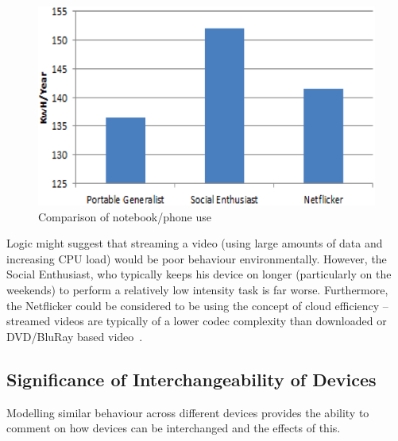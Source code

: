 \documentclass[conference]{IEEEtran}
\begin{document}
\begin{figure}[!ht]
\centering
\includegraphics[width=0.9\columnwidth]{images/comparison_users_devices.png}
\caption{Comparison of notebook/phone use}
\label{fig:comparison_users_devices.png} 
\end{figure}

Logic might suggest that streaming a video (using large amounts of
data and increasing CPU load) would be poor behaviour
environmentally. However, the Social Enthusiast, who typically keeps
his device on longer (particularly on the weekends) to perform a
relatively low intensity task is far worse. Furthermore, the
Netflicker could be considered to be using the concept of cloud
efficiency -- streamed videos are typically of a lower codec
complexity than downloaded or DVD/BluRay based
video~\cite{schien-et-al:2013}.

\subsection{Significance of Interchangeability of Devices}

Modelling similar behaviour across different devices provides the
ability to comment on how devices can be interchanged and the effects
of this.

\end{document}
